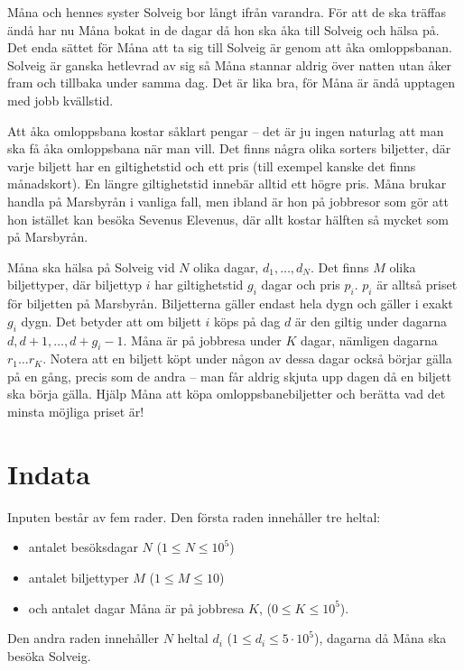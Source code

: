 \def\version{jury-2}
\noindent
Måna och hennes syster Solveig bor långt ifrån varandra.
För att de ska träffas ändå har nu Måna bokat in de dagar då hon ska åka till Solveig och hälsa på.
Det enda sättet för Måna att ta sig till Solveig är genom att åka omloppsbanan.
Solveig är ganska hetlevrad av sig så Måna stannar aldrig över natten utan åker fram och tillbaka under samma dag.
Det är lika bra, för Måna är ändå upptagen med jobb kvällstid.

Att åka omloppsbana kostar såklart pengar -- det är ju ingen naturlag att man ska få åka omloppsbana när man vill.
Det finns några olika sorters biljetter, där varje biljett har en giltighetstid och ett pris (till exempel kanske det finns månadskort).
En längre giltighetstid innebär alltid ett högre pris.
Måna brukar handla på Marsbyrån i vanliga fall, men ibland är hon på jobbresor som gör att hon istället kan besöka Sevenus Elevenus, där allt kostar hälften så mycket som på Marsbyrån.

Måna ska hälsa på Solveig vid $N$ olika dagar, $d_1, \dots, d_N$.
Det finns $M$ olika biljettyper, där biljettyp $i$ har giltighetstid $g_i$ dagar och pris $p_i$. $p_i$ är alltså priset för biljetten på Marsbyrån.
Biljetterna gäller endast hela dygn och gäller i exakt $g_i$ dygn.
Det betyder att om biljett $i$ köps på dag $d$ är den giltig under dagarna $d,d+1,\ldots,d+g_i-1$.
Måna är på jobbresa under $K$ dagar, nämligen dagarna $r_1 \dots r_K$.
Notera att en biljett köpt under någon av dessa dagar också börjar gälla på en gång, precis som de andra -- man får aldrig skjuta upp dagen då en biljett ska börja gälla.
Hjälp Måna att köpa omloppsbanebiljetter och berätta vad det minsta möjliga priset är! 

\section*{Indata}
Inputen består av fem rader.
Den första raden innehåller tre heltal:
\begin{itemize}
        \item antalet besöksdagar $N$ ($1\leq N\leq 10^5$)
        \item antalet biljettyper $M$ ($1\leq M\leq 10$)
        \item och antalet dagar Måna är på jobbresa $K$, ($0\leq K\leq 10^5$).
\end{itemize}

Den andra raden innehåller $N$ heltal $d_i$ ($1 \leq d_i \leq 5\cdot10^5$), dagarna då Måna ska besöka Solveig.

